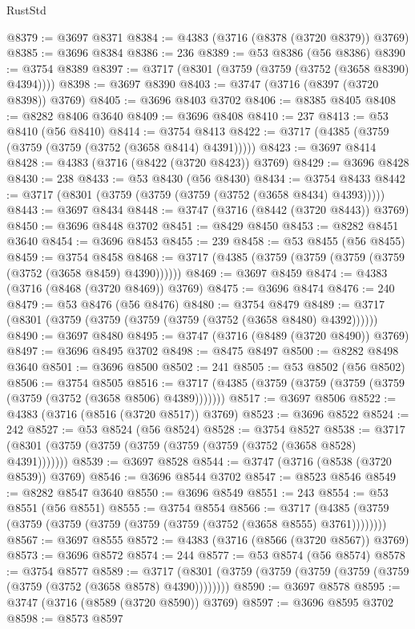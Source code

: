 \begin{lexlean}{RustStd}
\begin{coremodule}
@8379 := @3697 @8371
@8384 := @4383 (@3716 (@8378 (@3720 @8379)) @3769)
@8385 := @3696 @8384
@8386 := 236
@8389 := @53 @8386 (@56 @8386)
@8390 := @3754 @8389
@8397 := @3717 (@8301 (@3759 (@3759 (@3752 (@3658 @8390) @4394))))
@8398 := @3697 @8390
@8403 := @3747 (@3716 (@8397 (@3720 @8398)) @3769)
@8405 := @3696 @8403 @3702
@8406 := @8385 @8405
@8408 := @8282 @8406 @3640
@8409 := @3696 @8408
@8410 := 237
@8413 := @53 @8410 (@56 @8410)
@8414 := @3754 @8413
@8422 := @3717 (@4385 (@3759 (@3759 (@3759 (@3752 (@3658 @8414) @4391)))))
@8423 := @3697 @8414
@8428 := @4383 (@3716 (@8422 (@3720 @8423)) @3769)
@8429 := @3696 @8428
@8430 := 238
@8433 := @53 @8430 (@56 @8430)
@8434 := @3754 @8433
@8442 := @3717 (@8301 (@3759 (@3759 (@3759 (@3752 (@3658 @8434) @4393)))))
@8443 := @3697 @8434
@8448 := @3747 (@3716 (@8442 (@3720 @8443)) @3769)
@8450 := @3696 @8448 @3702
@8451 := @8429 @8450
@8453 := @8282 @8451 @3640
@8454 := @3696 @8453
@8455 := 239
@8458 := @53 @8455 (@56 @8455)
@8459 := @3754 @8458
@8468 := @3717 (@4385 (@3759 (@3759 (@3759 (@3759 (@3752 (@3658 @8459) @4390))))))
@8469 := @3697 @8459
@8474 := @4383 (@3716 (@8468 (@3720 @8469)) @3769)
@8475 := @3696 @8474
@8476 := 240
@8479 := @53 @8476 (@56 @8476)
@8480 := @3754 @8479
@8489 := @3717 (@8301 (@3759 (@3759 (@3759 (@3759 (@3752 (@3658 @8480) @4392))))))
@8490 := @3697 @8480
@8495 := @3747 (@3716 (@8489 (@3720 @8490)) @3769)
@8497 := @3696 @8495 @3702
@8498 := @8475 @8497
@8500 := @8282 @8498 @3640
@8501 := @3696 @8500
@8502 := 241
@8505 := @53 @8502 (@56 @8502)
@8506 := @3754 @8505
@8516 := @3717 (@4385 (@3759 (@3759 (@3759 (@3759 (@3759 (@3752 (@3658 @8506) @4389)))))))
@8517 := @3697 @8506
@8522 := @4383 (@3716 (@8516 (@3720 @8517)) @3769)
@8523 := @3696 @8522
@8524 := 242
@8527 := @53 @8524 (@56 @8524)
@8528 := @3754 @8527
@8538 := @3717 (@8301 (@3759 (@3759 (@3759 (@3759 (@3759 (@3752 (@3658 @8528) @4391)))))))
@8539 := @3697 @8528
@8544 := @3747 (@3716 (@8538 (@3720 @8539)) @3769)
@8546 := @3696 @8544 @3702
@8547 := @8523 @8546
@8549 := @8282 @8547 @3640
@8550 := @3696 @8549
@8551 := 243
@8554 := @53 @8551 (@56 @8551)
@8555 := @3754 @8554
@8566 := @3717 (@4385 (@3759 (@3759 (@3759 (@3759 (@3759 (@3759 (@3752 (@3658 @8555) @3761))))))))
@8567 := @3697 @8555
@8572 := @4383 (@3716 (@8566 (@3720 @8567)) @3769)
@8573 := @3696 @8572
@8574 := 244
@8577 := @53 @8574 (@56 @8574)
@8578 := @3754 @8577
@8589 := @3717 (@8301 (@3759 (@3759 (@3759 (@3759 (@3759 (@3759 (@3752 (@3658 @8578) @4390))))))))
@8590 := @3697 @8578
@8595 := @3747 (@3716 (@8589 (@3720 @8590)) @3769)
@8597 := @3696 @8595 @3702
@8598 := @8573 @8597

\end{coremodule}
\end{lexlean}

